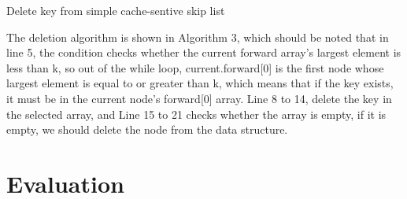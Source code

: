 \documentclass{article}
\begin{document}
\begin{algorithm}[H]
        \caption{Delete key from simple cache-sentive skip list}
        \end{algorithm}
    



The deletion algorithm is shown in Algorithm 3, which should be noted that in line 5,  the condition checks whether the current forward array's largest element is less than k, so out of the while loop,  current.forward[0] is the first node whose largest element is equal to or greater than k, which means that if the key exists, it must be in the current node’s forward[0] array. Line 8 to 14, delete the key in the selected array, and Line 15 to 21 checks whether the array is empty, if it is empty, we should delete the node from the data structure.


\section{Evaluation}
\end{document}
